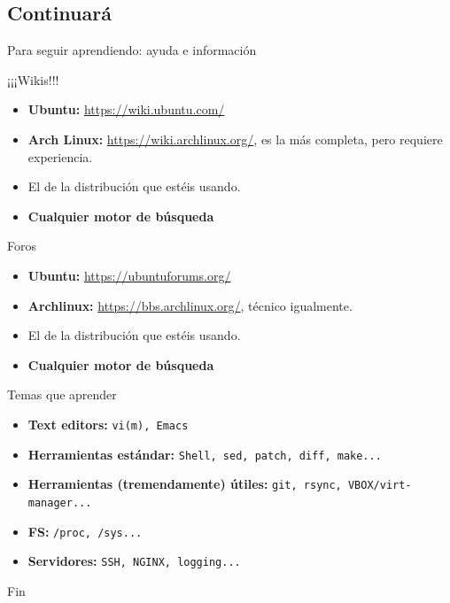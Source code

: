 \documentclass[12pt]{beamer}
\begin{document}
\subsection{Continuará}
\begin{frame}[allowframebreaks]{Para seguir aprendiendo: ayuda e información}
	\begin{block}{¡¡¡Wikis!!!}
		\begin{itemize}
			\item \textbf{Ubuntu:} \href{https://wiki.ubuntu.com/}{https://wiki.ubuntu.com/}
			\item \textbf{Arch Linux:} \href{https://wiki.archlinux.org/}{https://wiki.archlinux.org/}, es la más completa, pero requiere experiencia.
			\item El de la distribución que estéis usando.
			\item \textbf{Cualquier motor de búsqueda}
		\end{itemize}
	\end{block}
	\begin{block}{Foros}
		\begin{itemize}
			\item \textbf{Ubuntu:} \href{https://ubuntuforums.org/}{https://ubuntuforums.org/}
			\item \textbf{Archlinux:} \href{https://bbs.archlinux.org/}{https://bbs.archlinux.org/}, técnico igualmente.
			\item El de la distribución que estéis usando.
			\item \textbf{Cualquier motor de búsqueda}
		\end{itemize}
	\end{block}
\end{frame}

\begin{frame}{Temas que aprender}
	\begin{itemize}
		\item \textbf{Text editors:} \texttt{vi(m), Emacs}
		\item \textbf{Herramientas estándar:} \texttt{Shell, sed, patch, diff, make...}
		\item \textbf{Herramientas (tremendamente) útiles:} \texttt{git, rsync, VBOX/virt-manager...}
		\item \textbf{FS:} \texttt{/proc, /sys...}
		\item \textbf{Servidores:} \texttt{SSH, NGINX, logging...}
	\end{itemize}
\end{frame}

\begin{frame}{Fin}
	
\end{frame}
\end{document}
